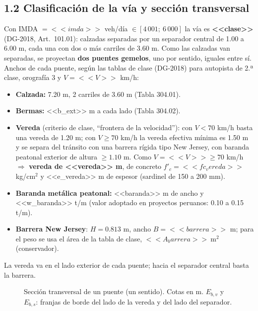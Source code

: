 \documentclass[11pt,a4paper]{article}
\begin{document}
\subsection*{1.2 Clasificación de la vía y sección transversal}
Con IMDA $= <<imda>>$ veh/día $\in [4\,001;\ 6\,000]$ la vía es \textbf{<<clase>>} (DG-2018, Art.~101.01):
calzadas separadas por un separador central de 1.00 a 6.00 m, cada una con dos o más carriles de 3.60 m.
Como las calzadas van separadas, se proyectan \textbf{dos puentes gemelos}, uno por sentido, iguales entre sí.
Anchos de cada puente, según las tablas de clase (DG-2018) para autopista de 2.ª clase, orografía 3 y
$V = <<V>>$ km/h:
\begin{itemize}[leftmargin=*,itemsep=1pt]
\item \textbf{Calzada:} 7.20 m, 2 carriles de 3.60 m (Tabla 304.01).
\item \textbf{Bermas:} <<b_ext>> m a cada lado (Tabla 304.02).
\item \textbf{Vereda} (criterio de clase, ``frontera de la velocidad''): con $V < 70$ km/h basta una vereda de 1.20 m;
  con $V \ge 70$ km/h la vereda efectiva mínima es 1.50 m y se separa del tránsito con una barrera rígida tipo
  New Jersey, con baranda peatonal exterior de altura $\ge 1.10$ m. Como $V = <<V>> \ge 70$ km/h
  $\Rightarrow$ \textbf{vereda de <<vereda>> m}, de concreto $f'_c = <<fc_vereda>>$ kg/cm$^2$ y <<e_vereda>> m de espesor
  (sardinel de 150 a 200 mm).
\item \textbf{Baranda metálica peatonal:} <<baranda>> m de ancho y <<w_baranda>> t/m (valor adoptado en proyectos
  peruanos: 0.10 a 0.15 t/m).
\item \textbf{Barrera New Jersey}: $H = 0.813$ m, ancho $B = <<barrera>>$ m; para el peso se usa el área de la
  tabla de clase, $<<A_barrera>>\ \mathrm{m^2}$ (conservador).
\end{itemize}
La vereda va en el lado exterior de cada puente; hacia el separador central basta la barrera.

\begin{figure}[H]
\centering
{}
\caption{Sección transversal de un puente (un sentido). Cotas en m. $E_{b,v}$ y $E_{b,s}$: franjas de borde
del lado de la vereda y del lado del separador.}
\end{figure}
\end{document}
